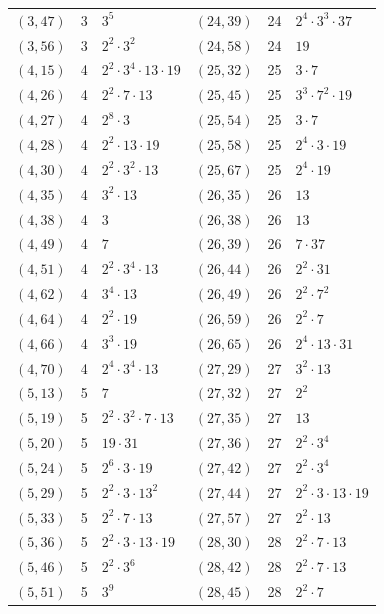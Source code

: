 \documentclass[11pt]{article}
\begin{document}
\begin{longtable}{@{}lrl@{\qquad}lrl@{}}
$(3,47)$ & 3 & $3^{5}$ & $(24,39)$ & 24 & $2^{4}\cdot 3^{3}\cdot 37$\\
$(3,56)$ & 3 & $2^{2}\cdot 3^{2}$ & $(24,58)$ & 24 & $19$\\
$(4,15)$ & 4 & $2^{2}\cdot 3^{4}\cdot 13\cdot 19$ & $(25,32)$ & 25 & $3\cdot 7$\\
$(4,26)$ & 4 & $2^{2}\cdot 7\cdot 13$ & $(25,45)$ & 25 & $3^{3}\cdot 7^{2}\cdot 19$\\
$(4,27)$ & 4 & $2^{8}\cdot 3$ & $(25,54)$ & 25 & $3\cdot 7$\\
$(4,28)$ & 4 & $2^{2}\cdot 13\cdot 19$ & $(25,58)$ & 25 & $2^{4}\cdot 3\cdot 19$\\
$(4,30)$ & 4 & $2^{2}\cdot 3^{2}\cdot 13$ & $(25,67)$ & 25 & $2^{4}\cdot 19$\\
$(4,35)$ & 4 & $3^{2}\cdot 13$ & $(26,35)$ & 26 & $13$\\
$(4,38)$ & 4 & $3$ & $(26,38)$ & 26 & $13$\\
$(4,49)$ & 4 & $7$ & $(26,39)$ & 26 & $7\cdot 37$\\
$(4,51)$ & 4 & $2^{2}\cdot 3^{4}\cdot 13$ & $(26,44)$ & 26 & $2^{2}\cdot 31$\\
$(4,62)$ & 4 & $3^{4}\cdot 13$ & $(26,49)$ & 26 & $2^{2}\cdot 7^{2}$\\
$(4,64)$ & 4 & $2^{2}\cdot 19$ & $(26,59)$ & 26 & $2^{2}\cdot 7$\\
$(4,66)$ & 4 & $3^{3}\cdot 19$ & $(26,65)$ & 26 & $2^{4}\cdot 13\cdot 31$\\
$(4,70)$ & 4 & $2^{4}\cdot 3^{4}\cdot 13$ & $(27,29)$ & 27 & $3^{2}\cdot 13$\\
$(5,13)$ & 5 & $7$ & $(27,32)$ & 27 & $2^{2}$\\
$(5,19)$ & 5 & $2^{2}\cdot 3^{2}\cdot 7\cdot 13$ & $(27,35)$ & 27 & $13$\\
$(5,20)$ & 5 & $19\cdot 31$ & $(27,36)$ & 27 & $2^{2}\cdot 3^{4}$\\
$(5,24)$ & 5 & $2^{6}\cdot 3\cdot 19$ & $(27,42)$ & 27 & $2^{2}\cdot 3^{4}$\\
$(5,29)$ & 5 & $2^{2}\cdot 3\cdot 13^{2}$ & $(27,44)$ & 27 & $2^{2}\cdot 3\cdot 13\cdot 19$\\
$(5,33)$ & 5 & $2^{2}\cdot 7\cdot 13$ & $(27,57)$ & 27 & $2^{2}\cdot 13$\\
$(5,36)$ & 5 & $2^{2}\cdot 3\cdot 13\cdot 19$ & $(28,30)$ & 28 & $2^{2}\cdot 7\cdot 13$\\
$(5,46)$ & 5 & $2^{2}\cdot 3^{6}$ & $(28,42)$ & 28 & $2^{2}\cdot 7\cdot 13$\\
$(5,51)$ & 5 & $3^{9}$ & $(28,45)$ & 28 & $2^{2}\cdot 7$\\

\end{longtable}
\end{document}
